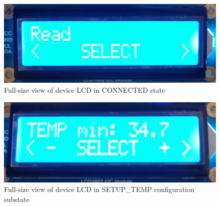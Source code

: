 \newpage
\begin{landscape}
\begin{figure}[H]
	\centering
	\includegraphics[width=\linewidth]{images/device_ui_connected.jpg}
	\caption{Full-size view of device LCD in CONNECTED state}
	\label{appendix:ui_connected}
\end{figure}
\end{landscape}

\newpage
\begin{landscape}
\begin{figure}[H]
	\centering
	\includegraphics[width=\linewidth]{images/device_ui_set_temp.jpg}
	\caption{Full-size view of device LCD in SETUP\_TEMP configuration substate}
	\label{appendix:ui_setup_temp}
\end{figure}
\end{landscape}

